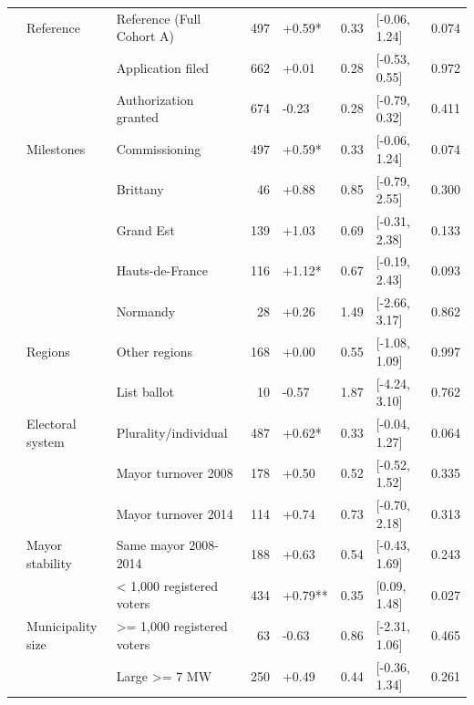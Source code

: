 \begin{ThreePartTable}
\begin{longtable}[t]{lllrllll}
\cmidrule{1-8}\pagebreak[0]
 & Reference & Reference (Full Cohort A) & 497 & +0.59* & 0.33 & {}[-0.06, 1.24] & 0.074\\
\cmidrule{2-8}\nopagebreak
 &  & Application filed & 662 & +0.01 & 0.28 & {}[-0.53, 0.55] & 0.972\\
\cmidrule{3-8}\nopagebreak
 &  & Authorization granted & 674 & -0.23 & 0.28 & {}[-0.79, 0.32] & 0.411\\
\cmidrule{3-8}\nopagebreak
 & \multirow[t]{-3}{*}{\raggedright\arraybackslash Milestones} & Commissioning & 497 & +0.59* & 0.33 & {}[-0.06, 1.24] & 0.074\\
\cmidrule{2-8}\nopagebreak
 &  & Brittany & 46 & +0.88 & 0.85 & {}[-0.79, 2.55] & 0.300\\
\cmidrule{3-8}\nopagebreak
 &  & Grand Est & 139 & +1.03 & 0.69 & {}[-0.31, 2.38] & 0.133\\
\cmidrule{3-8}\nopagebreak
 &  & Hauts-de-France & 116 & +1.12* & 0.67 & {}[-0.19, 2.43] & 0.093\\
\cmidrule{3-8}\nopagebreak
 &  & Normandy & 28 & +0.26 & 1.49 & {}[-2.66, 3.17] & 0.862\\
\cmidrule{3-8}\nopagebreak
 & \multirow[t]{-5}{*}{\raggedright\arraybackslash Regions} & Other regions & 168 & +0.00 & 0.55 & {}[-1.08, 1.09] & 0.997\\
\cmidrule{2-8}\nopagebreak
 &  & List ballot & 10 & -0.57 & 1.87 & {}[-4.24, 3.10] & 0.762\\
\cmidrule{3-8}\nopagebreak
 & \multirow[t]{-2}{*}{\raggedright\arraybackslash Electoral system} & Plurality/individual & 487 & +0.62* & 0.33 & {}[-0.04, 1.27] & 0.064\\
\cmidrule{2-8}\nopagebreak
 &  & Mayor turnover 2008 & 178 & +0.50 & 0.52 & {}[-0.52, 1.52] & 0.335\\
\cmidrule{3-8}\nopagebreak
 &  & Mayor turnover 2014 & 114 & +0.74 & 0.73 & {}[-0.70, 2.18] & 0.313\\
\cmidrule{3-8}\nopagebreak
 & \multirow[t]{-3}{*}{\raggedright\arraybackslash Mayor stability} & Same mayor 2008-2014 & 188 & +0.63 & 0.54 & {}[-0.43, 1.69] & 0.243\\
\cmidrule{2-8}\nopagebreak
 &  & < 1,000 registered voters & 434 & +0.79** & 0.35 & {}[0.09, 1.48] & 0.027\\
\cmidrule{3-8}\nopagebreak
 & \multirow[t]{-2}{*}{\raggedright\arraybackslash Municipality size} & >= 1,000 registered voters & 63 & -0.63 & 0.86 & {}[-2.31, 1.06] & 0.465\\
\cmidrule{2-8}\nopagebreak
 &  & Large >= 7 MW & 250 & +0.49 & 0.44 & {}[-0.36, 1.34] & 0.261\\

\end{longtable}
\end{ThreePartTable}
